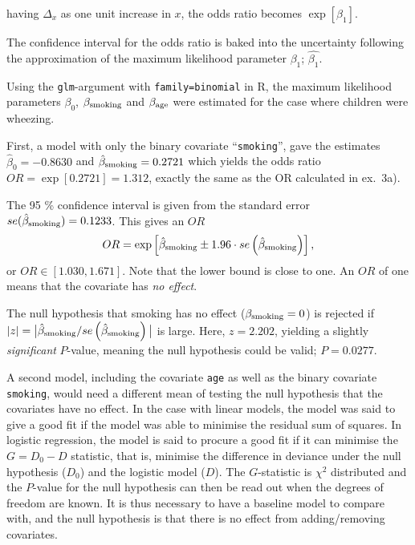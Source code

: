 \documentclass[a4paper,11pt]{article}
\begin{document}
\begin{enumerate}[label=3\alph*)]
        having $\Delta_x$ as one unit increase in $x$, the odds ratio becomes $\exp[\beta_1]$. 

        The confidence interval for the odds ratio is baked into the uncertainty following the approximation of the maximum likelihood parameter $\beta_1$; $\hat{\beta_1}$. 

        Using the \texttt{glm}-argument with \texttt{family=binomial} in R, the maximum likelihood parameters $\beta_0$, $\beta_{\rm smoking}$ and $\beta_{\rm age}$ were estimated for the case where children were wheezing.

        First, a model with only the binary covariate ``\texttt{smoking}'', gave the estimates $\hat{\beta}_0 = -0.8630$ and $\hat{\beta}_{\rm smoking} = 0.2721$ which yields the odds ratio $OR = \exp[0.2721] = 1.312$, exactly the same as the OR calculated in ex.~3a). 
        
        The 95 \% confidence interval is given from the standard error $se(\hat{\beta}_{\rm smoking}) = 0.1233$. This gives an $OR$
        \begin{equation}
         OR = \exp \left[ \hat{\beta}_{\rm smoking} \pm 1.96 \cdot se\left( \hat{\beta}_{\rm smoking} \right) \right],
            \label{OR}
        \end{equation}
        or  $OR \in \left[1.030, 1.671  \right]$. Note that the lower bound is close to one. An $OR$ of one means that the covariate has \textit{no effect}. 
        
        The null hypothesis that smoking has no effect ($\beta_{\rm smoking} = 0$) is rejected if $|z| = \big| \hat{\beta}_{\rm smoking} / se\left( \hat{\beta}_{\rm smoking}  \right) \big|$ is large. Here, $z = 2.202$, yielding a slightly \textit{significant} $P$-value, meaning the null hypothesis could be valid; $P = 0.0277$. 

        A second model, including the covariate \texttt{age} as well as the binary covariate \texttt{smoking}, would need a different mean of testing the null hypothesis that the covariates have no effect. In the case with linear models, the model was said to give a good fit if the model was able to minimise the residual sum of squares. In logistic regression, the model is said to procure a good fit if it can minimise the $G = D_0 - D$ statistic, that is, minimise the difference in deviance under the null hypothesis ($D_0$) and the logistic model ($D$). The $G$-statistic is $\chi^2$ distributed and the $P$-value for the null hypothesis can then be read out when the degrees of freedom are known. It is thus necessary to have a baseline model to compare with, and the null hypothesis is that there is no effect from adding/removing covariates.


\end{enumerate}
\end{document}
